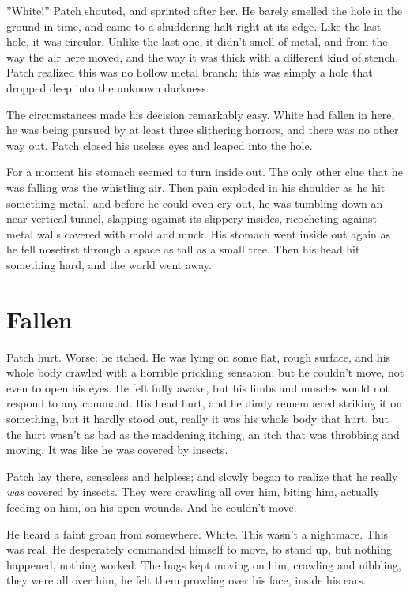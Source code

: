 \documentclass[12pt]{book}
\begin{document}
''White!'' Patch shouted, and sprinted after her. He barely smelled the hole in the ground in time, and came to a shuddering halt right at its edge. Like the last hole, it was circular. Unlike the last one, it didn't smell of metal, and from the way the air here moved, and the way it was thick with a different kind of stench, Patch realized this was no hollow metal branch: this was simply a hole that dropped deep into the unknown darkness.

The circumstances made his decision remarkably easy. White had fallen in here, he was being pursued by at least three slithering horrors, and there was no other way out. Patch closed his useless eyes and leaped into the hole.

For a moment his stomach seemed to turn inside out. The only other clue that he was falling was the whistling air. Then pain exploded in his shoulder as he hit something metal, and before he could even cry out, he was tumbling down an near-vertical tunnel, slapping against its slippery insides, ricocheting against metal walls covered with mold and muck. His stomach went inside out again as he fell nosefirst through a space as tall as a small tree. Then his head hit something hard, and the world went away.


\section{Fallen}

Patch hurt. Worse: he itched. He was lying on some flat, rough surface, and his whole body crawled with a horrible prickling sensation; but he couldn't move, not even to open his eyes. He felt fully awake, but his limbs and muscles would not respond to any command. His head hurt, and he dimly remembered striking it on something, but it hardly stood out, really it was his whole body that hurt, but the hurt wasn't as bad as the maddening itching, an itch that was throbbing and moving. It was like he was covered by insects.

Patch lay there, senseless and helpless; and slowly began to realize that he really {\it was} covered by insects. They were crawling all over him, biting him, actually feeding on him, on his open wounds. And he couldn't move.

He heard a faint groan from somewhere. White. This wasn't a nightmare. This was real. He desperately commanded himself to move, to stand up, but nothing happened, nothing worked. The bugs kept moving on him, crawling and nibbling, they were all over him, he felt them prowling over his face, inside his ears.
\end{document}
